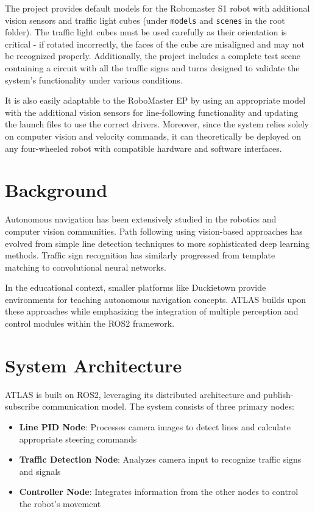 \documentclass[9pt,technote]{IEEEtran}
\begin{document}
The project provides default models for the Robomaster S1 robot with additional vision sensors and traffic light cubes (under \texttt{models} and \texttt{scenes} in the root folder). The traffic light cubes must be used carefully as their orientation is critical - if rotated incorrectly, the faces of the cube are misaligned and may not be recognized properly. Additionally, the project includes a complete test scene containing a circuit with all the traffic signs and turns designed to validate the system's functionality under various conditions.

It is also easily adaptable to the RoboMaster EP by using an appropriate model with the additional vision sensors for line-following functionality and updating the launch files to use the correct drivers. Moreover, since the system relies solely on computer vision and velocity commands, it can theoretically be deployed on any four-wheeled robot with compatible hardware and software interfaces.

\section{Background}
Autonomous navigation has been extensively studied in the robotics and computer vision communities. Path following using vision-based approaches has evolved from simple line detection techniques to more sophisticated deep learning methods. Traffic sign recognition has similarly progressed from template matching to convolutional neural networks.

In the educational context, smaller platforms like Duckietown provide environments for teaching autonomous navigation concepts. ATLAS builds upon these approaches while emphasizing the integration of multiple perception and control modules within the ROS2 framework.

\section{System Architecture}
ATLAS is built on ROS2, leveraging its distributed architecture and publish-subscribe communication model. The system consists of three primary nodes:

\begin{itemize}
    \item \textbf{Line PID Node}: Processes camera images to detect lines and calculate appropriate steering commands
    \item \textbf{Traffic Detection Node}: Analyzes camera input to recognize traffic signs and signals
    \item \textbf{Controller Node}: Integrates information from the other nodes to control the robot's movement
\end{itemize}
\end{document}
